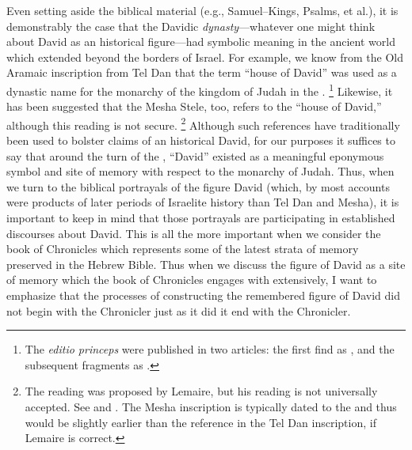 Even setting aside the biblical material (e.g., Samuel--Kings, Psalms, et al.), it is demonstrably the case that the Davidic \emph{dynasty}---whatever one might think about David as an historical figure---had symbolic meaning in the ancient world which extended beyond the borders of Israel. For example, we know from the Old Aramaic inscription from Tel Dan that the term  ``house of David'' was used as a dynastic name for the monarchy of the kingdom of Judah in the .%
    \footnote{The \emph{editio princeps} were published in two articles: the first find as \cite{biran-naveh_iej1993}, and the subsequent fragments as \cite{biran-naveh_iej1995}.}
Likewise, it has been suggested that the Mesha Stele, too, refers to the ``house of David,'' although this reading is not secure.%
    \footnote{The reading  was proposed by Lemaire, but his reading is not universally accepted. See \cite{lemaire_sel1994} and \cite{lemaire_bar1994}. The Mesha inscription is typically dated to the  and thus would be slightly earlier than the reference in the Tel Dan inscription, if Lemaire is correct.}
Although such references have traditionally been used to bolster claims of an historical David, for our purposes it suffices to say that around the turn of the , ``David'' existed as a meaningful eponymous symbol and site of memory with respect to the monarchy of Judah. Thus, when we turn to the biblical portrayals of the figure David (which, by most accounts were products of later periods of Israelite history than Tel Dan and Mesha), it is important to keep in mind that those portrayals are participating in established discourses about David. This is all the more important when we consider the book of Chronicles which represents some of the latest strata of memory preserved in the Hebrew Bible. Thus when we discuss the figure of David as a site of memory which the book of Chronicles engages with extensively, I want to emphasize that the processes of constructing the remembered figure of David did not begin with the Chronicler just as it did it end with the Chronicler.

